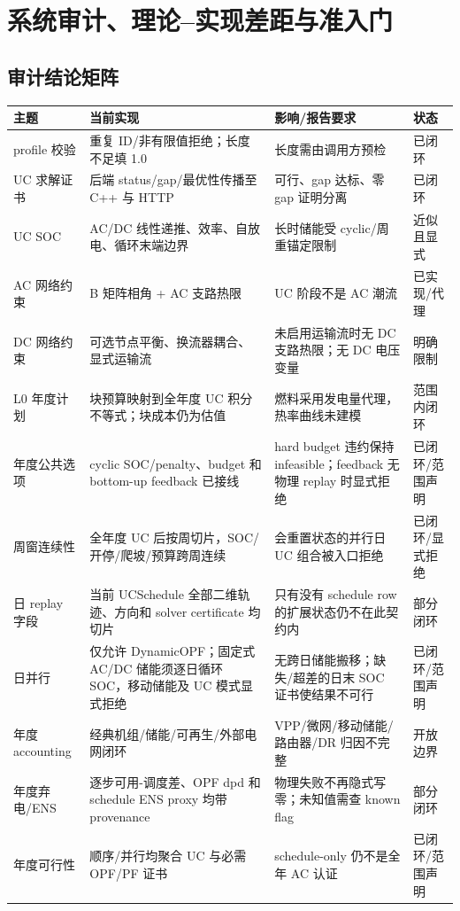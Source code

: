 \section{系统审计、理论--实现差距与准入门}
\label{sec:ts-audit}

\subsection{审计结论矩阵}
\begin{longtable}{@{}L{3.6cm}L{3.1cm}L{4.3cm}L{2.1cm}@{}}
\toprule
主题 & 当前实现 & 影响/报告要求 & 状态\\ \midrule
profile 校验 & 重复 ID/非有限值拒绝；长度不足填 1.0 & 长度需由调用方预检 & 已闭环\\
UC 求解证书 & 后端 status/gap/最优性传播至 C++ 与 HTTP & 可行、gap 达标、零 gap 证明分离 & 已闭环\\
UC SOC & AC/DC 线性递推、效率、自放电、循环末端边界 & 长时储能受 cyclic/周重锚定限制 & 近似且显式\\
AC 网络约束 & B 矩阵相角 + AC 支路热限 & UC 阶段不是 AC 潮流 & 已实现/代理\\
DC 网络约束 & 可选节点平衡、换流器耦合、显式运输流 & 未启用运输流时无 DC 支路热限；无 DC 电压变量 & 明确限制\\
L0 年度计划 & 块预算映射到全年度 UC 积分不等式；块成本仍为估值 & 燃料采用发电量代理，热率曲线未建模 & 范围内闭环\\
年度公共选项 & cyclic SOC/penalty、budget 和 bottom-up feedback 已接线 & hard budget 违约保持 infeasible；feedback 无物理 replay 时显式拒绝 & 已闭环/范围声明\\
周窗连续性 & 全年度 UC 后按周切片，SOC/开停/爬坡/预算跨周连续 & 会重置状态的并行日 UC 组合被入口拒绝 & 已闭环/显式拒绝\\
日 replay 字段 & 当前 UCSchedule 全部二维轨迹、方向和 solver certificate 均切片 & 只有没有 schedule row 的扩展状态仍不在此契约内 & 部分闭环\\
日并行 & 仅允许 DynamicOPF；固定式 AC/DC 储能须逐日循环 SOC，移动储能及 UC 模式显式拒绝 & 无跨日储能搬移；缺失/超差的日末 SOC 证书使结果不可行 & 已闭环/范围声明\\
年度 accounting & 经典机组/储能/可再生/外部电网闭环 & VPP/微网/移动储能/路由器/DR 归因不完整 & 开放边界\\
年度弃电/ENS & 逐步可用-调度差、OPF dpd 和 schedule ENS proxy 均带 provenance & 物理失败不再隐式写零；未知值需查 known flag & 部分闭环\\
年度可行性 & 顺序/并行均聚合 UC 与必需 OPF/PF 证书 & schedule-only 仍不是全年 AC 认证 & 已闭环/范围声明\\

\end{longtable}
